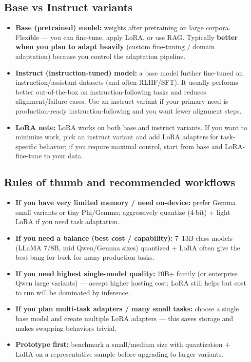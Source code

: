 \documentclass[a4paper, 12pt]{article}
\begin{document}
\subsection*{Base vs Instruct variants}
\begin{itemize}
  \item \textbf{Base (pretrained) model:} weights after pretraining on large corpora. Flexible — you can fine-tune, apply LoRA, or use RAG. Typically \textbf{better when you plan to adapt heavily} (custom fine-tuning / domain adaptation) because you control the adaptation pipeline.
  \item \textbf{Instruct (instruction-tuned) model:} a base model further fine-tuned on instruction/assistant datasets (and often RLHF/SFT). It usually performs better out-of-the-box on instruction-following tasks and reduces alignment/failure cases. Use an instruct variant if your primary need is production-ready instruction-following and you want fewer alignment steps.
  \item \textbf{LoRA note:} LoRA works on both base and instruct variants. If you want to minimize work, pick an instruct variant and add LoRA adapters for task-specific behavior; if you require maximal control, start from base and LoRA-fine-tune to your data.
\end{itemize}

\subsection*{Rules of thumb and recommended workflows}
\begin{tcolorbox}[colback=blue!5!white,colframe=blue!75!black,title=Quick rules of thumb]
\begin{itemize}
  \item \textbf{If you have very limited memory / need on-device:} prefer Gemma small variants or tiny Phi/Gemma; aggressively quantize (4-bit) + light LoRA if you need task adaptation.
  \item \textbf{If you need a balance (best cost / capability):} 7--13B-class models (LLaMA 7/8B, mid Qwen/Gemma sizes) quantized + LoRA often give the best bang-for-buck for many production tasks.
  \item \textbf{If you need highest single-model quality:} 70B+ family (or enterprise Qwen large variants) — accept higher hosting cost; LoRA still helps but cost to run will be dominated by inference.
  \item \textbf{If you plan multi-task adapters / many small tasks:} choose a single base model and create multiple LoRA adapters — this saves storage and makes swapping behaviors trivial.
  \item \textbf{Prototype first:} benchmark a small/medium size with quantization + LoRA on a representative sample before upgrading to larger variants.
\end{itemize}
\end{tcolorbox}
\end{document}
